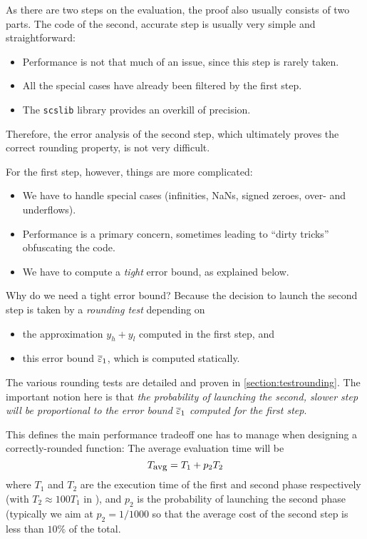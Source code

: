 As there are two steps on the evaluation, the proof also usually
consists of two parts. The code of the second, accurate step is
usually very simple and straightforward:
\begin{itemize}
\item Performance is not that much of an issue, since this step is rarely taken.
\item All the special cases have already been filtered by the first step.
\item The \texttt{scslib} library provides an overkill of precision.
\end{itemize}

Therefore, the error analysis of the second step, which ultimately
proves the correct rounding property, is not very difficult.

For the first step, however, things are more complicated:
\begin{itemize}
\item We have to handle special cases (infinities, NaNs, signed
  zeroes, over- and underflows).
\item Performance is a primary concern, sometimes leading to ``dirty
  tricks'' obfuscating the code.
\item We have to compute a \emph{tight} error bound, as explained below.
\end{itemize}

Why do we need a tight error bound? Because the decision to launch the
second step is taken by a \emph{rounding test}  depending on
\begin{itemize}
\item the approximation $y_h+y_l$ computed in the first step, and
\item this error bound ${\overline{\varepsilon}}_1$, which is computed statically.
\end{itemize}

The various rounding tests are detailed and proven in
\ref{section:testrounding}.  The important notion here is that
\emph{the probability of launching the second, slower step will be
  proportional to the error bound ${\overline{\varepsilon}}_1$ computed for the first step}.

This defines the main performance tradeoff one has to manage when
designing a correctly-rounded function: The average evaluation time
will be
\begin{equation}
  T_{\mbox{\small avg}} = T_1 + p_2T_2 \label{eq:Tavg}
\end{equation}
where $T_1$ and $T_2$ are the execution time of the first and second
phase respectively (with $T_2\approx 100T_1$ in \crlibm), and $p_2$ is
the probability of launching the second phase (typically we aim at
$p_2=1/1000$ so that the average cost of the second step is less than
$10\%$ of the total.  

